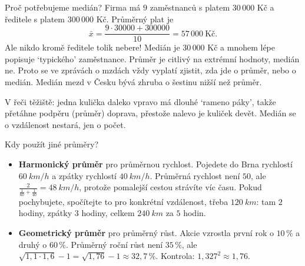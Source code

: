 \begin{example}
  Proč potřebujeme medián? Firma má $9$ zaměstnanců s platem $30\,000$ Kč a ředitele s platem $300\,000$ Kč. Průměrný plat je
  \begin{equation*}
    \bar{x} = \frac{9\cdot 30000 + 300000}{10} = 57\,000\ \text{Kč}.
  \end{equation*}
  Ale nikdo kromě ředitele tolik nebere! Medián je $30\,000$ Kč a mnohem lépe popisuje `typického' zaměstnance. Průměr je citlivý na extrémní hodnoty, medián ne. Proto se ve zprávách o mzdách vždy vyplatí zjistit, zda jde o průměr, nebo o medián. Medián mezd v Česku bývá zhruba o šestinu nižší než průměr.

  \begin{center}
  \end{center}
  V řeči těžiště: jedna kulička daleko vpravo má dlouhé `rameno páky', takže přetáhne podpěru (průměr) doprava, přestože nalevo je kuliček devět. Medián se o vzdálenost nestará, jen o počet.
\end{example}

\begin{example}\label{ex:jine-prumery}
  Kdy použít jiné průměry?
  \begin{itemize}
    \item \textbf{Harmonický průměr} pro průměrnou rychlost. Pojedete do Brna rychlostí $60\ \si{km/h}$ a zpátky rychlostí $40\ \si{km/h}$. Průměrná rychlost není $50$, ale $\frac{2}{\frac{1}{60} + \frac{1}{40}} = 48\ \si{km/h}$, protože pomalejší cestou strávíte víc času. Pokud pochybujete, spočítejte to pro konkrétní vzdálenost, třeba $120\ \si{km}$: tam $2$ hodiny, zpátky $3$ hodiny, celkem $240\ \si{km}$ za $5$ hodin.
    \item \textbf{Geometrický průměr} pro průměrný růst. Akcie vzrostla první rok o $10\,\%$ a druhý o $60\,\%$. Průměrný roční růst není $35\,\%$, ale $\sqrt{1{,}1\cdot 1{,}6} - 1 = \sqrt{1{,}76} - 1\approx 32{,}7\,\%$. Kontrola: $1{,}327^2\approx 1{,}76$.
  \end{itemize}
\end{example}

